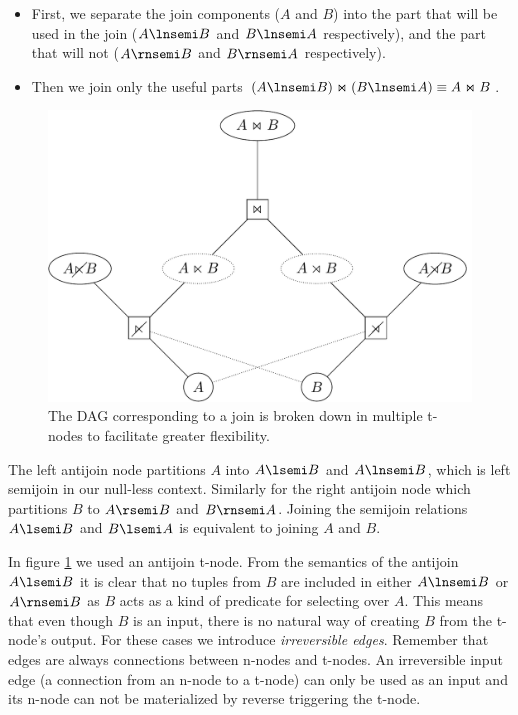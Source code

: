 \begin{itemize}
\item First, we separate the join components (\(A\) and \(B\)) into the
  part that will be used in the join (\(A \lnsemi B\) and \(B \lnsemi A\)
  respectively), and the part that will not (\(A \rnsemi B\) and
  \(B \rnsemi A\) respectively).
\item Then we join only the useful parts
  \((A \lnsemi B) \Join (B \lnsemi A) \equiv A \Join B\).
\end{itemize}

\begin{figure}[p]
  \centering \includegraphics[width=.9\linewidth]{./imgs/joinnet.pdf}
  \caption{\label{fig:joinnet}The DAG corresponding to a join is
    broken down in multiple t-nodes to facilitate greater
    flexibility.}
\end{figure}

The left antijoin node partitions \(A\) into \(A \lsemi B\) and
\(A \lnsemi B\), which is left semijoin in our null-less
context. Similarly for the right antijoin node which partitions \(B\)
to \(A \rsemi B\) and \(B \rnsemi A\). Joining the semijoin relations
\(A \lsemi B\) and \(B \lsemi A\) is equivalent to joining \(A\) and
\(B\).

In figure \ref{fig:joinnet} we used an antijoin t-node. From the
semantics of the antijoin \(A \lsemi B\) it is clear that no tuples
from \(B\) are included in either \(A \lnsemi B\) or \(A \rnsemi B\)
as \(B\) acts as a kind of predicate for selecting over \(A\). This
means that even though \(B\) is an input, there is no natural
way of creating \(B\) from the t-node's output. For these cases we
introduce \emph{irreversible edges}. Remember that edges are always connections
between n-nodes and t-nodes. An irreversible input edge (a connection
from an n-node to a t-node) can only be used as an input and its n-node
can not be materialized by reverse triggering the t-node.

